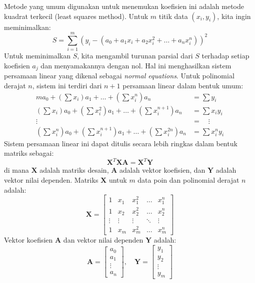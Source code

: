 \documentclass[conference]{IEEEtran}
\begin{document}
Metode yang umum digunakan untuk menemukan koefisien ini adalah metode kuadrat terkecil (least squares method). Untuk $m$ titik data $(x_i, y_i)$, kita ingin meminimalkan:
\begin{equation}
S = \sum_{i=1}^{m} (y_i - (a_0 + a_1x_i + a_2x_i^2 + \dots + a_nx_i^n))^2
\label{eq:sum_sq_residuals}
\end{equation}
Untuk meminimalkan $S$, kita mengambil turunan parsial dari $S$ terhadap setiap koefisien $a_j$ dan menyamakannya dengan nol. Hal ini menghasilkan sistem persamaan linear yang dikenal sebagai \textit{normal equations}. Untuk polinomial derajat $n$, sistem ini terdiri dari $n+1$ persamaan linear dalam bentuk umum:
\begin{align}
m a_0 + (\sum x_i) a_1 + \dots + (\sum x_i^n) a_n &= \sum y_i \nonumber \\
(\sum x_i) a_0 + (\sum x_i^2) a_1 + \dots + (\sum x_i^{n+1}) a_n &= \sum x_i y_i \label{eq:normal_equations_expanded} \\
\vdots \quad &= \quad \vdots \nonumber \\
(\sum x_i^n) a_0 + (\sum x_i^{n+1}) a_1 + \dots + (\sum x_i^{2n}) a_n &= \sum x_i^n y_i \nonumber
\end{align}
Sistem persamaan linear ini dapat ditulis secara lebih ringkas dalam bentuk matriks sebagai:
\begin{equation}
\mathbf{X}^T\mathbf{X}\mathbf{A} = \mathbf{X}^T\mathbf{Y}
\label{eq:normal_equations_matrix_form}
\end{equation}
di mana $\mathbf{X}$ adalah matriks desain, $\mathbf{A}$ adalah vektor koefisien, dan $\mathbf{Y}$ adalah vektor nilai dependen. Matriks $\mathbf{X}$ untuk $m$ data poin dan polinomial derajat $n$ adalah:
\begin{equation}
\mathbf{X} = \begin{bmatrix}
1 & x_1 & x_1^2 & \dots & x_1^n \\
1 & x_2 & x_2^2 & \dots & x_2^n \\
\vdots & \vdots & \vdots & \ddots & \vdots \\
1 & x_m & x_m^2 & \dots & x_m^n
\end{bmatrix}
\label{eq:design_matrix_X}
\end{equation}
Vektor koefisien $\mathbf{A}$ dan vektor nilai dependen $\mathbf{Y}$ adalah:
\begin{equation}
\mathbf{A} = \begin{bmatrix} a_0 \\ a_1 \\ \vdots \\ a_n \end{bmatrix}, \quad
\mathbf{Y} = \begin{bmatrix} y_1 \\ y_2 \\ \vdots \\ y_m \end{bmatrix}
\label{eq:vectors_A_Y}
\end{equation}
\end{document}

